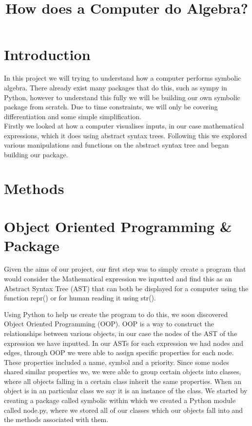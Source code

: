 \documentclass[12pt]{article}
\author{}
\title{\textbf{How does a Computer do Algebra?}}
\date{}
\newcommand\blankpage{
    \null
    \thispagestyle{empty}
    \newpage
    }
\begin{document}
\afterpage{\blankpage}

\maketitle
\newpage

\afterpage{\blankpage}
\tableofcontents



\newpage




\section{Introduction}
In this project we will trying to understand how a computer performs symbolic algebra. There already exist many packages that do this, such as sympy in Python, however to understand this fully we will be building our own symbolic package from scratch. Due to time constraints, we will only be covering differentiation and some simple simplification.\\
Firstly we looked at how a computer visualises inputs, in our case mathematical expressions, which it does using abstract syntax trees. Following this we explored various manipulations and functions on the abstract syntax tree and began building our package.


\section{Methods}


\section{Object Oriented Programming \& Package}
Given the aims of our project, our first step was to simply create a program that would consider the Mathematical expression we inputted and find this as an Abstract Syntax Tree (AST) that can both be displayed for a computer using the function repr() or for human reading it using str(). 

Using Python to help us create the program to do this, we soon discovered Object Oriented Programming (OOP). OOP is a way to construct the relationships between various objects, in our case the nodes of the AST of the expression we have inputted. In our ASTs for each expression we had nodes and edges, through OOP we were able to assign specific properties for each node. These properties included a name, symbol and a priority. Since some nodes shared similar properties we, we were able to group certain objects into classes, where all objects falling in a certain class inherit the same properties. When an object is in an particular class we say it is an instance of the class. We started by creating a package called symbolic within which we created a Python module called node.py, where we stored all of our classes which our objects fall into and the methods associated with them. 
\end{document}
